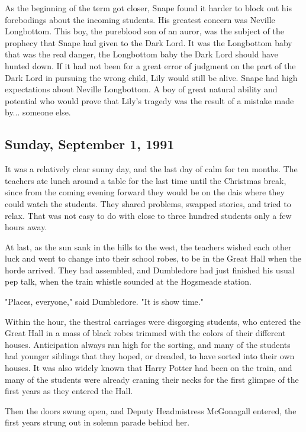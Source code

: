 As the beginning of the term got closer, Snape found it harder to block out his forebodings about the incoming students. His greatest concern was Neville Longbottom. This boy, the pureblood son of an auror, was the subject of the prophecy that Snape had given to the Dark Lord. It was the Longbottom baby that was the real danger, the Longbottom baby the Dark Lord should have hunted down. If it had not been for a great error of judgment on the part of the Dark Lord in pursuing the wrong child, Lily would still be alive. Snape had high expectations about Neville Longbottom. A boy of great natural ability and potential who would prove that Lily's tragedy was the result of a mistake made by... someone else.

\subsection{Sunday, September 1, 1991}

It was a relatively clear sunny day, and the last day of calm for ten months. The teachers ate lunch around a table for the last time until the Christmas break, since from the coming evening forward they would be on the dais where they could watch the students. They shared problems, swapped stories, and tried to relax. That was not easy to do with close to three hundred students only a few hours away.

At last, as the sun sank in the hills to the west, the teachers wished each other luck and went to change into their school robes, to be in the Great Hall when the horde arrived. They had assembled, and Dumbledore had just finished his usual pep talk, when the train whistle sounded at the Hogsmeade station.

"Places, everyone," said Dumbledore. "It is show time."

Within the hour, the thestral carriages were disgorging students, who entered the Great Hall in a mass of black robes trimmed with the colors of their different houses. Anticipation always ran high for the sorting, and many of the students had younger siblings that they hoped, or dreaded, to have sorted into their own houses. It was also widely known that Harry Potter had been on the train, and many of the students were already craning their necks for the first glimpse of the first years as they entered the Hall.

Then the doors swung open, and Deputy Headmistress McGonagall entered, the first years strung out in solemn parade behind her.

